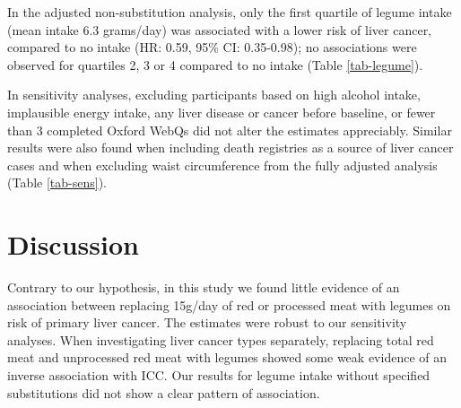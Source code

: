 \documentclass[nutrients,article,submit,moreauthors,pdftex]{Definitions/mdpi}
\begin{document}
In the adjusted non-substitution analysis, only the first quartile of
legume intake (mean intake 6.3 grams/day) was associated with a lower
risk of liver cancer, compared to no intake (HR: 0.59, 95\% CI:
0.35-0.98); no associations were observed for quartiles 2, 3 or 4
compared to no intake (Table \ref{tab-legume}).

In sensitivity analyses, excluding participants based on high alcohol
intake, implausible energy intake, any liver disease or cancer before
baseline, or fewer than 3 completed Oxford WebQs did not alter the
estimates appreciably. Similar results were also found when including
death registries as a source of liver cancer cases and when excluding
waist circumference from the fully adjusted analysis (Table
\ref{tab-sens}).

\hypertarget{sec4}{%
\section{Discussion}\label{sec4}}

Contrary to our hypothesis, in this study we found little evidence of an
association between replacing 15g/day of red or processed meat with
legumes on risk of primary liver cancer. The estimates were robust to
our sensitivity analyses. When investigating liver cancer types
separately, replacing total red meat and unprocessed red meat with
legumes showed some weak evidence of an inverse association with ICC.
Our results for legume intake without specified substitutions did not
show a clear pattern of association.
\end{document}
